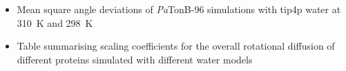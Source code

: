 \documentclass[journal=jpcbfk,manuscript=article]{achemso}
\begin{document}
\begin{suppinfo}


   \begin{itemize} 
  \item Mean square angle deviations of {\it Pa}TonB-96 simulations with tip4p water at 310~K and 298~K
  \item Table summarising scaling coefficients for the overall rotational diffusion of different proteins simulated with different water models
 \end{itemize} 

\end{suppinfo}


\end{document}
